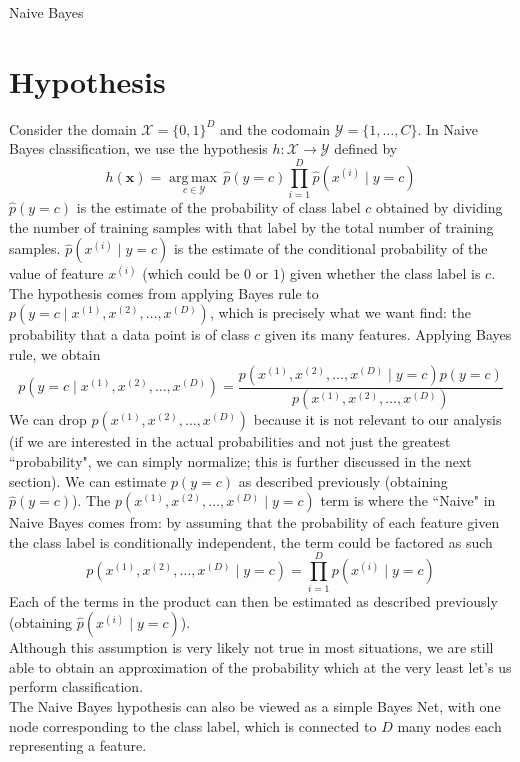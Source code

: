 \documentclass[12pt]{article}
\newcommand{\argmax}[1]{\underset{#1}{\operatorname{arg\,max\,}}}
\begin{document}
\begin{center}
	\LARGE{Naive Bayes}
\end{center}

\section{Hypothesis}

Consider the domain $\mathcal{X} = \{0, 1\}^D$ and the codomain  $\mathcal{Y} = \{1, \dots, C\}$. In Naive Bayes classification, we use the hypothesis $h : \mathcal{X} \rightarrow \mathcal{Y}$ defined by
\[ h(\mathbf{x}) = \argmax{c\in\mathcal{Y}}\hat{p}(y = c)\prod_{i=1}^{D}\hat{p}(x^{(i)} \mid y = c) \]
$\hat{p}(y = c)$ is the estimate of the probability of class label $c$ obtained by dividing the number of training samples with that label by the total number of training samples. $\hat{p}(x^{(i)} \mid y = c)$ is the estimate of the conditional probability of the value of feature $x^{(i)}$ (which could be $0$ or $1$) given whether the class label is $c$.
\\\newline
The hypothesis comes from applying Bayes rule to $p(y = c \mid x^{(1)}, x^{(2)}, \dots, x^{(D)})$, which is precisely what we want find: the probability that a data point is of class $c$ given its many features. Applying Bayes rule, we obtain
\[ p(y = c \mid x^{(1)}, x^{(2)}, \dots, x^{(D)}) = \frac{p(x^{(1)}, x^{(2)}, \dots, x^{(D)} \mid y = c)p(y = c)}{p(x^{(1)}, x^{(2)}, \dots, x^{(D)})} \]
We can drop $p(x^{(1)}, x^{(2)}, \dots, x^{(D)})$ because it is not relevant to our analysis (if we are interested in the actual probabilities and not just the greatest ``probability", we can simply normalize; this is further discussed in the next section). We can estimate $p(y = c)$ as described previously (obtaining $\hat{p}(y = c)$). The $p(x^{(1)}, x^{(2)}, \dots, x^{(D)} \mid y = c)$ term is where the ``Naive" in Naive Bayes comes from: by assuming that the probability of each feature given the class label is conditionally independent, the term could be factored as such
\[ p(x^{(1)}, x^{(2)}, \dots, x^{(D)} \mid y = c) = \prod_{i=1}^{D}p(x^{(i)} \mid y = c) \]
Each of the terms in the product can then be estimated as described previously (obtaining $\hat{p}(x^{(i)} \mid y = c)$).
\\\newline
Although this assumption is very likely not true in most situations, we are still able to obtain an approximation of the probability which at the very least let's us perform classification.
\\\newline
The Naive Bayes hypothesis can also be viewed as a simple Bayes Net, with one node corresponding to the class label, which is connected to $D$ many nodes each representing a feature.
\end{document}
